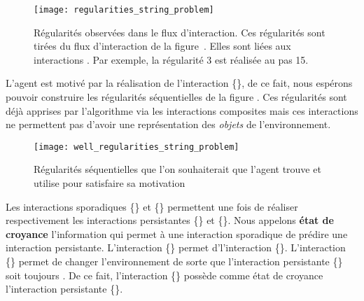 \documentclass{llncs}
\begin{document}
\begin{figure}
	\centering
	\texttt{[image: regularities\_string\_problem]}
	\caption{Régularités observées dans le flux d'interaction. Ces régularités sont tirées du flux d'interaction de la figure~. Elles sont liées aux interactions \enacted. Par exemple, la régularité \num{3} est réalisée au pas 15.}
	\label{fig:regularities_string_problem}	
\end{figure}

L'agent est motivé par la réalisation de l'interaction \{\triangleBlanc\}, de ce fait, nous espérons pouvoir construire les régularités séquentielles de la figure . Ces régularités sont déjà apprises par l'algorithme via les interactions composites mais ces interactions ne permettent pas d'avoir une représentation des \emph{objets} de l'environnement. 

\begin{figure}
	\centering
	\texttt{[image: well\_regularities\_string\_problem]}
	\caption{Régularités séquentielles que l'on souhaiterait que l'agent trouve et utilise pour satisfaire sa motivation}
	\label{fig:well_regularities_string_problem}
\end{figure}

Les interactions sporadiques \{\rondBlanc\} et \{\rondBleu\} permettent une fois \enacted de réaliser respectivement les interactions persistantes \{\carreBlanc\} et \{\carreBleu\}. Nous appelons \textbf{état de croyance} l'information qui permet à une interaction sporadique de prédire une interaction persistante. L'interaction \{\carreBlanc\} permet d'\enact l'interaction \{\triangleBlanc\}. L'interaction \{\rondBlanc\} permet de changer l'environnement de sorte que l'interaction persistante \{\carreBlanc\} soit toujours \enact. De ce fait, l'interaction \{\rondBlanc\} possède comme état de croyance l'interaction persistante \{\carreBlanc\}. 
\end{document}
